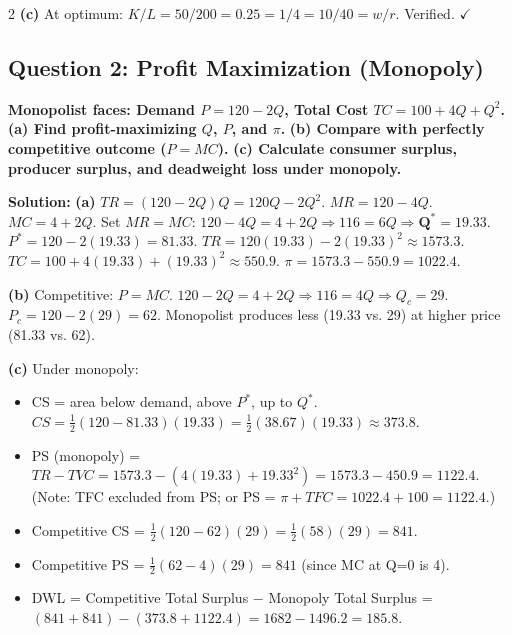 \documentclass[10pt,a4paper]{article}
\begin{document}
\begin{multicols}{2}
\textbf{(c)} At optimum: $K/L = 50/200 = 0.25 = 1/4 = 10/40 = w/r$. Verified. $\checkmark$

\vspace{0.2cm}

\subsection*{Question 2: Profit Maximization (Monopoly)}
\textbf{Monopolist faces: Demand $P = 120 - 2Q$, Total Cost $TC = 100 + 4Q + Q^2$.}
\textbf{(a) Find profit-maximizing $Q$, $P$, and $\pi$.}
\textbf{(b) Compare with perfectly competitive outcome ($P = MC$).}
\textbf{(c) Calculate consumer surplus, producer surplus, and deadweight loss under monopoly.}

\vspace{0.05cm}
\textbf{Solution:}
\vspace{0.05cm}
\textbf{(a)} $TR = (120 - 2Q)Q = 120Q - 2Q^2$. $MR = 120 - 4Q$.
$MC = 4 + 2Q$. Set $MR = MC$: $120 - 4Q = 4 + 2Q \Rightarrow 116 = 6Q \Rightarrow \mathbf{Q^* = 19.33}$.
$P^* = 120 - 2(19.33) = \mathbf{81.33}$.
$TR = 120(19.33) - 2(19.33)^2 \approx 1573.3$. $TC = 100 + 4(19.33) + (19.33)^2 \approx 550.9$.
$\pi = 1573.3 - 550.9 = \mathbf{1022.4}$.

\textbf{(b)} Competitive: $P = MC$. $120 - 2Q = 4 + 2Q \Rightarrow 116 = 4Q \Rightarrow Q_c = 29$.
$P_c = 120 - 2(29) = 62$. Monopolist produces less (19.33 vs. 29) at higher price (81.33 vs. 62).

\textbf{(c)} Under monopoly:
\begin{itemize}[nosep]
    \item CS = area below demand, above $P^*$, up to $Q^*$. $CS = \frac{1}{2}(120 - 81.33)(19.33) = \frac{1}{2}(38.67)(19.33) \approx 373.8$.
    \item PS (monopoly) = $TR - TVC = 1573.3 - (4(19.33) + 19.33^2) = 1573.3 - 450.9 = 1122.4$. (Note: TFC excluded from PS; or PS = $\pi + TFC = 1022.4 + 100 = 1122.4$.)
    \item Competitive CS = $\frac{1}{2}(120-62)(29) = \frac{1}{2}(58)(29) = 841$.
    \item Competitive PS = $\frac{1}{2}(62-4)(29) = 841$ (since MC at Q=0 is 4).
    \item DWL = Competitive Total Surplus $-$ Monopoly Total Surplus = $(841+841) - (373.8+1122.4) = 1682 - 1496.2 = \mathbf{185.8}$.
\end{itemize}

\vspace{0.2cm}


\end{multicols}
\end{document}
